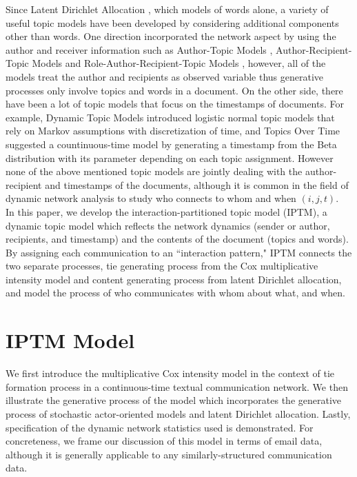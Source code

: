 \documentclass[a4paper]{article}
\begin{document}
Since Latent Dirichlet Allocation \citep{Blei2003}, which models of words alone, a variety of useful topic models have been developed by considering additional components other than words. One direction incorporated the network aspect by using the author and receiver information such as Author-Topic Models \citep{rosen2004author}, Author-Recipient-Topic Models and Role-Author-Recipient-Topic Models \citep{mccallum2005topic}, however, all of the models treat the author and recipients as observed variable thus generative processes only involve topics and words in a document. On the other side, there have been a lot of topic
models that focus on the timestamps of documents. For example, Dynamic Topic Models \citep{blei2006dynamic} introduced logistic normal topic models that rely on Markov assumptions with discretization of time, and Topics Over Time \citep{wang2006topics} suggested a countinuous-time model by generating a timestamp from the Beta distribution with its parameter depending on each topic assignment. However none of the above mentioned topic models are jointly dealing with the author-recipient and timestamps of the documents, although it is common in the field of dynamic network analysis to study who connects to whom and when $(i, j, t)$. \\ \newline
In this paper, we develop the interaction-partitioned topic model (IPTM), a dynamic topic model which reflects the network dynamics (sender or author, recipients, and timestamp) and the contents of the document (topics and words). By assigning each communication to an
``interaction pattern," IPTM connects the two separate processes, tie generating process from the Cox multiplicative intensity model and content generating process from latent Dirichlet allocation, and model the process of who communicates with whom about what, and when. 
\section{IPTM Model} \label{sec: IPTM Model}
We first introduce the multiplicative Cox intensity model in the context of tie formation process in a continuous-time textual communication network. We then illustrate the generative process of the model which incorporates the generative process of stochastic actor-oriented models and latent Dirichlet allocation. Lastly, specification of the dynamic network statistics used is demonstrated. For concreteness, we frame our discussion of this model in terms of email data, although it is generally applicable to any similarly-structured communication data.
\end{document}

